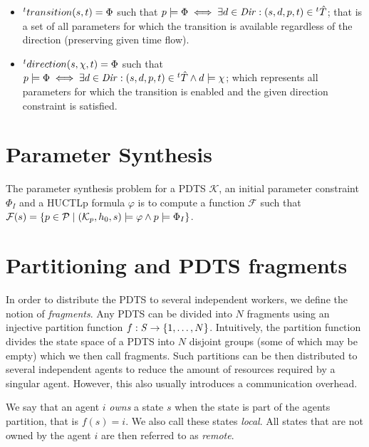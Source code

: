 \begin{itemize}
	\item ${}^{t}transition(s,t) = \Phi$ such that $p \models \Phi \iff \exists d \in \mathit{Dir} : (s, d, p, t) \in {}^{t}\hat{T}$; that is a set of all parameters for which the transition is available regardless of the direction (preserving given time flow).
	\item ${}^{t}direction(s, \chi ,t) = \Phi$ such that $p \models \Phi \iff \exists d \in \mathit{Dir} : (s, d, p, t) \in {}^{t}\hat{T} \land d \models \chi$; which represents all parameters for which the transition is enabled and the given direction constraint is satisfied.
\end{itemize}


\section{Parameter Synthesis}

The parameter synthesis problem for a \ac{PDTS} $\mathcal{K}$, an initial parameter constraint $\Phi_I$ and a \ac{HUCTLp} formula $\varphi$ is to compute a function $\mathcal{F}$ such that $\mathcal{F}(s) = \{p \in \mathcal{P} \mid (\mathcal{K}_p, h_0, s) \models \varphi \land p \models \Phi_I \}$.

\section{Partitioning and \ac{PDTS} fragments}

In order to distribute the \ac{PDTS} to several independent workers, we define the notion of \emph{fragments}. Any \ac{PDTS} can be divided into $N$ fragments using an injective partition function $f: \mathit{S} \to \{1, \ldots, N \}$. Intuitively, the partition function divides the state space of a \ac{PDTS} into $N$ disjoint groups (some of which may be empty) which we then call fragments. Such partitions can be then distributed to several independent agents to reduce the amount of resources required by a singular agent. However, this also usually introduces a communication overhead. 

We say that an agent $i$ \emph{owns} a state $s$ when the state is part of the agents partition, that is $f(s) = i$. We also call these states \emph{local}. All states that are not owned by the agent $i$ are then referred to as \emph{remote}.

